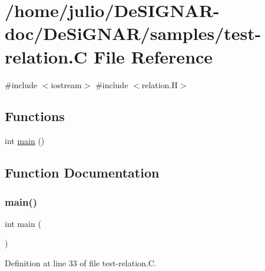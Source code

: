 \hypertarget{test-relation_8_c}{}\section{/home/julio/\+De\+S\+I\+G\+N\+A\+R-\/doc/\+De\+Si\+G\+N\+A\+R/samples/test-\/relation.C File Reference}
\label{test-relation_8_c}
{\ttfamily \#include $<$iostream$>$}\newline
{\ttfamily \#include $<$relation.\+H$>$}\newline
\subsection*{Functions}
\begin{DoxyCompactItemize}
\item 
int \hyperlink{test-relation_8_c_ae66f6b31b5ad750f1fe042a706a4e3d4}{main} ()
\end{DoxyCompactItemize}


\subsection{Function Documentation}
\mbox{\label{test-relation_8_c_ae66f6b31b5ad750f1fe042a706a4e3d4}} 
\subsubsection{\texorpdfstring{main()}{main()}}
{\footnotesize\ttfamily int main (\begin{DoxyParamCaption}{ }\end{DoxyParamCaption})}



Definition at line 33 of file test-\/relation.\+C.

